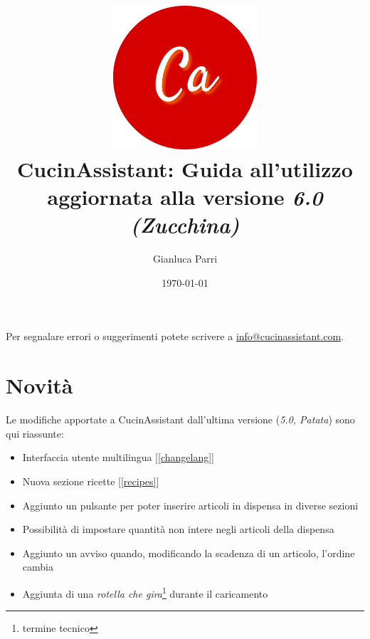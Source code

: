\documentclass[12pt, a4paper]{report}
\begin{document}
    \title{
        \includegraphics[width=0.4\textwidth]{assets/logo.png}\\
        [1cm]CucinAssistant: Guida all'utilizzo\\
        \large aggiornata alla versione \emph{6.0 (Zucchina)}
    }
    \author{Gianluca Parri}
    \date{\today}
    \maketitle



    \tableofcontents
    \vfill
    \noindent Per segnalare errori o suggerimenti potete scrivere a \href{mailto:info@cucinassistant.com}{\mbox{info@cucinassistant.com}}.



    \chapter{Novità}
    
    Le modifiche apportate a CucinAssistant dall'ultima versione (\emph{5.0, Patata}) sono qui riassunte:

    \begin{itemize}
        \item Interfaccia utente multilingua [\ref{changelang}]
        \item Nuova sezione ricette [\ref{recipes}]
        \item Aggiunto un pulsante per poter inserire articoli in dispensa in diverse sezioni
        \item Possibilità di impostare quantità non intere negli articoli della dispensa
        \item Aggiunto un avviso quando, modificando la scadenza di un articolo, l'ordine cambia
        \item Aggiunta di una \emph{rotella che gira}\footnote{termine tecnico} durante il caricamento
    \end{itemize}
\end{document}
